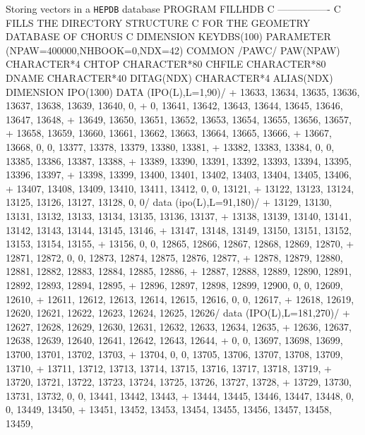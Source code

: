 \begin{XMPt}{Storing vectors in a {\tt HEPDB} database}
      PROGRAM FILLHDB
C     ----------------
C     FILLS THE DIRECTORY STRUCTURE
C     FOR THE GEOMETRY DATABASE OF CHORUS
C
      DIMENSION KEYDBS(100)
      PARAMETER (NPAW=400000,NHBOOK=0,NDX=42)
      COMMON /PAWC/ PAW(NPAW)
      CHARACTER*4 CHTOP
      CHARACTER*80 CHFILE
      CHARACTER*80 DNAME
      CHARACTER*40 DITAG(NDX)
      CHARACTER*4  ALIAS(NDX)
      DIMENSION IPO(1300)
      DATA (IPO(L),L=1,90)/
     + 13633, 13634, 13635, 13636, 13637, 13638, 13639, 13640,     0,
     +     0, 13641, 13642, 13643, 13644, 13645, 13646, 13647, 13648,
     + 13649, 13650, 13651, 13652, 13653, 13654, 13655, 13656, 13657,
     + 13658, 13659, 13660, 13661, 13662, 13663, 13664, 13665, 13666,
     + 13667, 13668,     0,     0, 13377, 13378, 13379, 13380, 13381,
     + 13382, 13383, 13384,     0,     0, 13385, 13386, 13387, 13388,
     + 13389, 13390, 13391, 13392, 13393, 13394, 13395, 13396, 13397,
     + 13398, 13399, 13400, 13401, 13402, 13403, 13404, 13405, 13406,
     + 13407, 13408, 13409, 13410, 13411, 13412,     0,     0, 13121,
     + 13122, 13123, 13124, 13125, 13126, 13127, 13128,     0,     0/
      data (ipo(L),L=91,180)/
     + 13129, 13130, 13131, 13132, 13133, 13134, 13135, 13136, 13137,
     + 13138, 13139, 13140, 13141, 13142, 13143, 13144, 13145, 13146,
     + 13147, 13148, 13149, 13150, 13151, 13152, 13153, 13154, 13155,
     + 13156,     0,     0, 12865, 12866, 12867, 12868, 12869, 12870,
     + 12871, 12872,     0,     0, 12873, 12874, 12875, 12876, 12877,
     + 12878, 12879, 12880, 12881, 12882, 12883, 12884, 12885, 12886,
     + 12887, 12888, 12889, 12890, 12891, 12892, 12893, 12894, 12895,
     + 12896, 12897, 12898, 12899, 12900,     0,     0, 12609, 12610,
     + 12611, 12612, 12613, 12614, 12615, 12616,     0,     0, 12617,
     + 12618, 12619, 12620, 12621, 12622, 12623, 12624, 12625, 12626/
      data (IPO(L),L=181,270)/
     + 12627, 12628, 12629, 12630, 12631, 12632, 12633, 12634, 12635,
     + 12636, 12637, 12638, 12639, 12640, 12641, 12642, 12643, 12644,
     +     0,     0, 13697, 13698, 13699, 13700, 13701, 13702, 13703,
     + 13704,     0,     0, 13705, 13706, 13707, 13708, 13709, 13710,
     + 13711, 13712, 13713, 13714, 13715, 13716, 13717, 13718, 13719,
     + 13720, 13721, 13722, 13723, 13724, 13725, 13726, 13727, 13728,
     + 13729, 13730, 13731, 13732,     0,     0, 13441, 13442, 13443,
     + 13444, 13445, 13446, 13447, 13448,     0,     0, 13449, 13450,
     + 13451, 13452, 13453, 13454, 13455, 13456, 13457, 13458, 13459,

\end{XMPt}
